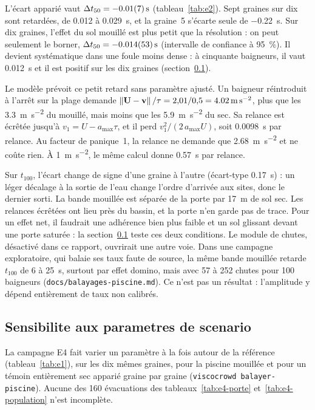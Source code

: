 L'écart apparié vaut $\Delta t_{50}=\SI{-0.01 \pm 0.07}{\second}$ (tableau~\ref{tab:e2}). Sept
graines sur dix sont retardées, de \num{0.012} à \SI{0.029}{\second}, et la graine~5 s'écarte
seule de \SI{-0.22}{\second}. Sur dix graines, l'effet du sol mouillé est plus petit que la
résolution : on peut seulement le borner, $\Delta t_{50}=\SI{-0.014 \pm 0.053}{\second}$
(intervalle de confiance à \SI{95}{\percent}). Il devient systématique dans une foule moins
dense : à cinquante baigneurs, il vaut \SI{0.012}{\second} et il est positif sur les dix
graines (section~\ref{sec:e4}).

Le modèle prévoit ce petit retard sans paramètre ajusté. Un baigneur réintroduit à l'arrêt sur
la plage demande $\left\lVert \mathbf{U}-\mathbf{v} \right\rVert/\tau=2{,}01/0{,}5=\SI{4.02}{\metre\per\second\squared}$,
plus que les \SI{3.3}{\metre\per\second\squared} du mouillé, mais moins que les
\SI{5.9}{\metre\per\second\squared} du sec. Sa relance est écrêtée jusqu'à
$v_1=U-a_{\max}\tau$, et il perd $v_1^2/(2\,a_{\max}U)$, soit \SI{0.0098}{\second} par
relance. Au facteur de panique~1, la relance ne demande que
\SI{2.68}{\metre\per\second\squared} et ne coûte rien. À \SI{1}{\metre\per\second\squared}, le
même calcul donne \SI{0.57}{\second} par relance.

Sur $t_{100}$, l'écart change de signe d'une graine à l'autre (écart-type
\SI{0.17}{\second}) : un léger décalage à la sortie de l'eau change l'ordre d'arrivée aux
sites, donc le dernier sorti. La bande mouillée est séparée de la porte par \SI{17}{\metre} de
sol sec. Les relances écrêtées ont lieu près du bassin, et la porte n'en garde pas de trace.
Pour un effet net, il faudrait une adhérence bien plus faible et un sol glissant devant une
porte saturée : la section~\ref{sec:e4} teste ces deux conditions. Le module de chutes,
désactivé dans ce rapport, ouvrirait une autre voie. Dans une campagne exploratoire, qui
balaie ses taux faute de source, la même bande mouillée retarde $t_{100}$ de 6 à
\SI{25}{\second}, surtout par effet domino, mais avec 57 à 252 chutes pour 100 baigneurs
(\texttt{docs/balayages-piscine.md}). Ce n'est pas un résultat : l'amplitude y dépend
entièrement de taux non calibrés.

\subsection{Sensibilite aux parametres de scenario}
\label{sec:e4}

La campagne E4 fait varier un paramètre à la fois autour de la référence
(tableau~\ref{tab:e1}), sur les dix mêmes graines, pour la piscine mouillée et pour un
témoin entièrement sec apparié graine par graine (\texttt{viscocrowd balayer-piscine}).
Aucune des 160 évacuations des tableaux~\ref{tab:e4-porte} et~\ref{tab:e4-population}
n'est incomplète.

